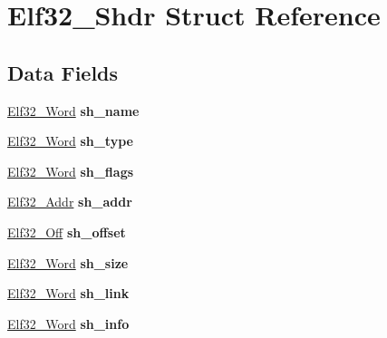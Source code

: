 \hypertarget{structElf32__Shdr}{\section{Elf32\-\_\-\-Shdr Struct Reference}
\label{structElf32__Shdr}
}
\subsection*{Data Fields}
\begin{DoxyCompactItemize}
\item 
\hypertarget{structElf32__Shdr_a6e8fd300ca473a31d0f65817ce371dfd}{\hyperlink{structElf32__Sword}{Elf32\-\_\-\-Word} {\bfseries sh\-\_\-name}}\label{structElf32__Shdr_a6e8fd300ca473a31d0f65817ce371dfd}

\item 
\hypertarget{structElf32__Shdr_aab6c221dbd7e16987df41280fb915408}{\hyperlink{structElf32__Sword}{Elf32\-\_\-\-Word} {\bfseries sh\-\_\-type}}\label{structElf32__Shdr_aab6c221dbd7e16987df41280fb915408}

\item 
\hypertarget{structElf32__Shdr_a27e003d8da37de3038a0065577a7743d}{\hyperlink{structElf32__Sword}{Elf32\-\_\-\-Word} {\bfseries sh\-\_\-flags}}\label{structElf32__Shdr_a27e003d8da37de3038a0065577a7743d}

\item 
\hypertarget{structElf32__Shdr_a7e668a62cee74a2f9c6edabb5f45635a}{\hyperlink{structElf32__Addr}{Elf32\-\_\-\-Addr} {\bfseries sh\-\_\-addr}}\label{structElf32__Shdr_a7e668a62cee74a2f9c6edabb5f45635a}

\item 
\hypertarget{structElf32__Shdr_a6e37227a5777cddc0a9dbbb3c2598ec1}{\hyperlink{structElf32__Addr}{Elf32\-\_\-\-Off} {\bfseries sh\-\_\-offset}}\label{structElf32__Shdr_a6e37227a5777cddc0a9dbbb3c2598ec1}

\item 
\hypertarget{structElf32__Shdr_a84dc67bb0ab65880bbcd74fbee722ff1}{\hyperlink{structElf32__Sword}{Elf32\-\_\-\-Word} {\bfseries sh\-\_\-size}}\label{structElf32__Shdr_a84dc67bb0ab65880bbcd74fbee722ff1}

\item 
\hypertarget{structElf32__Shdr_ad759308388eb14c5c6e4d636c38999da}{\hyperlink{structElf32__Sword}{Elf32\-\_\-\-Word} {\bfseries sh\-\_\-link}}\label{structElf32__Shdr_ad759308388eb14c5c6e4d636c38999da}

\item 
\hypertarget{structElf32__Shdr_aef63fe62c2c9927f374c4f987954c6e5}{\hyperlink{structElf32__Sword}{Elf32\-\_\-\-Word} {\bfseries sh\-\_\-info}}\label{structElf32__Shdr_aef63fe62c2c9927f374c4f987954c6e5}


\end{DoxyCompactItemize}
